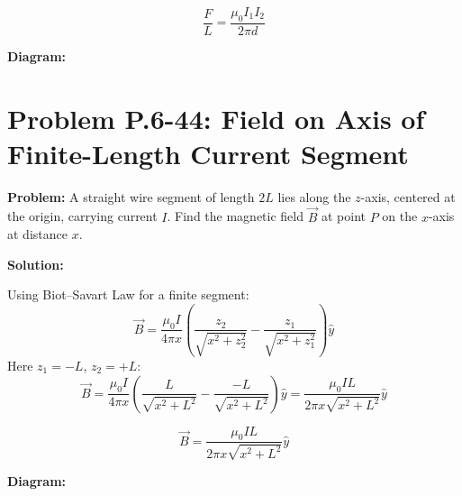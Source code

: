 \documentclass[12pt]{article}
\begin{document}
\begin{tcolorbox}
\[
\boxed{\frac{F}{L} = \frac{\mu_0 I_1 I_2}{2\pi d}}
\]
\end{tcolorbox}

\textbf{Diagram:}
\begin{center}
\end{center}



\section*{Problem P.6-44: Field on Axis of Finite-Length Current Segment}

\textbf{Problem:}  
A straight wire segment of length \( 2L \) lies along the \( z \)-axis, centered at the origin, carrying current \( I \). Find the magnetic field \( \vec{B} \) at point \( P \) on the \( x \)-axis at distance \( x \).

\textbf{Solution:}

Using Biot–Savart Law for a finite segment:
\[
\vec{B} = \frac{\mu_0 I}{4\pi x} \left( \frac{z_2}{\sqrt{x^2 + z_2^2}} - \frac{z_1}{\sqrt{x^2 + z_1^2}} \right) \hat{y}
\]
Here \( z_1 = -L \), \( z_2 = +L \):
\[
\vec{B} = \frac{\mu_0 I}{4\pi x} \left( \frac{L}{\sqrt{x^2 + L^2}} - \frac{-L}{\sqrt{x^2 + L^2}} \right) \hat{y}
= \frac{\mu_0 I L}{2\pi x \sqrt{x^2 + L^2}} \hat{y}
\]

\begin{tcolorbox}
\[
\boxed{\vec{B} = \frac{\mu_0 I L}{2\pi x \sqrt{x^2 + L^2}} \hat{y}}
\]
\end{tcolorbox}

\textbf{Diagram:}
\begin{center}
\end{center}
\end{document}
